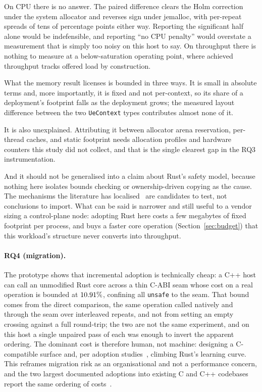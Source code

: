 \documentclass[english,twoside,openright,a4paper,censored,csm,software-track-2020]{HYthesisML}
\begin{document}
On CPU there is no answer. The paired difference clears the Holm correction under the system
allocator and reverses sign under jemalloc, with per-repeat spreads of tens of percentage
points either way. Reporting the significant half alone would be indefensible, and reporting
``no CPU penalty'' would overstate a measurement that is simply too noisy on this host to say.
On throughput there is nothing to measure at a below-saturation operating point, where achieved
throughput tracks offered load by construction.

What the memory result licenses is bounded in three ways. It is small in absolute terms and,
more importantly, it is fixed and not per-context, so its share of a deployment's footprint falls
as the deployment grows; the measured layout difference between the two \texttt{UeContext} types
contributes almost none of it.

It is also unexplained. Attributing it between allocator arena reservation, per-thread caches, and
static footprint needs allocation profiles and hardware counters this study did not collect, and
that is the single clearest gap in the RQ3 instrumentation.

And it should not be generalised into a claim about Rust's safety model, because nothing here
isolates bounds checking or ownership-driven copying as the cause. The mechanisms the literature
has localised~\cite{zhang2022runtime,harris2023morello} are candidates to test, not conclusions to
import. What can be said is narrower and still
useful to a vendor sizing a control-plane node: adopting Rust here costs a few megabytes of
fixed footprint per process, and buys a faster core operation
(Section~\ref{sec:budget}) that this workload's structure never converts into throughput.

\paragraph{RQ4 (migration).} The prototype shows that incremental adoption is technically
cheap: a C++ host can call an unmodified Rust core across a thin C-ABI seam whose cost on a
real operation is bounded at $10.91\%$, confining all \texttt{unsafe} to the seam.
That bound comes from the direct comparison, the same operation called natively and through
the seam over \FfiOpRepeats{} interleaved repeats, and not from setting an empty crossing
against a full round-trip; the two are not the same experiment, and on this host a single
unpaired pass of each was enough to invert the apparent ordering. The dominant cost is
therefore human, not machine: designing a C-compatible surface and, per adoption
studies~\cite{fulton2021adopting,crichton2024learning}, climbing Rust's learning curve. This
reframes migration risk as an organisational and not a performance concern, and the two
largest documented adoptions into existing C and C++ codebases report the same ordering of
costs~\cite{li2024rustforlinux,fan2026android}.
\end{document}
